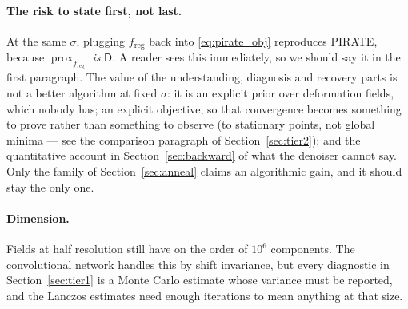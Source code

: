 \documentclass[11pt]{article}
\theoremstyle{definition}
\newcommand{\D}{\mathsf{D}}
\newcommand{\freg}{f_{\mathrm{reg}}}
\newcommand{\prox}{\operatorname{prox}}
\begin{document}
\paragraph{The risk to state first, not last.} At the same $\sigma$, plugging $\freg$ back into \eqref{eq:pirate_obj} reproduces PIRATE, because $\prox_{\freg}$ \emph{is} $\D$. A reader sees this immediately, so we should say it in the first paragraph. The value of the understanding, diagnosis and recovery parts is not a better algorithm at fixed $\sigma$: it is an explicit prior over deformation fields, which nobody has; an explicit objective, so that convergence becomes something to prove rather than something to observe (to stationary points, not global minima — see the comparison paragraph of Section~\ref{sec:tier2}); and the quantitative account in Section~\ref{sec:backward} of what the denoiser cannot say. Only the family of Section~\ref{sec:anneal} claims an algorithmic gain, and it should stay the only one.

\paragraph{Dimension.} Fields at half resolution still have on the order of $10^6$ components. The convolutional network handles this by shift invariance, but every diagnostic in Section~\ref{sec:tier1} is a Monte Carlo estimate whose variance must be reported, and the Lanczos estimates need enough iterations to mean anything at that size.
\end{document}
